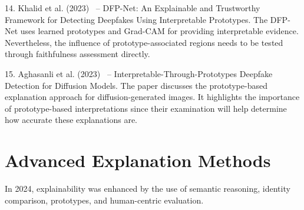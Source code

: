 \documentclass[12pt,a4wide]{report}
\theoremstyle{plain}
\theoremstyle{definition}
\theoremstyle{remark}
\begin{document}
\begin{description}
\item 14. Khalid et al. (2023)~\cite{khalid2023dfpnet} – DFP-Net: An Explainable and Trustworthy Framework for Detecting Deepfakes Using Interpretable Prototypes. The DFP-Net uses learned prototypes and Grad-CAM for providing interpretable evidence. Nevertheless, the influence of prototype-associated regions needs to be tested through faithfulness assessment directly.

\item 15. Aghasanli et al. (2023)~\cite{aghasanli2023prototypes} – Interpretable-Through-Prototypes Deepfake Detection for Diffusion Models. The paper discusses the prototype-based explanation approach for diffusion-generated images. It highlights the importance of prototype-based interpretations since their examination will help determine how accurate these explanations are.\\

\end{description}

\section{Advanced Explanation Methods}
\label{sec:xai}

In 2024, explainability was enhanced by the use of semantic reasoning, identity comparison, prototypes, and human-centric evaluation.
\end{document}
